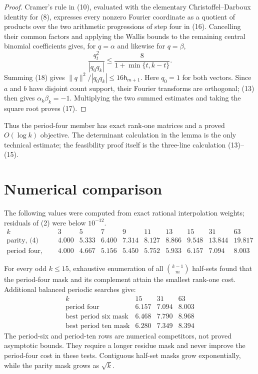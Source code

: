 \documentclass[11pt]{article}
\newcommand{\1}{\mathbf 1}
\newcommand{\norm}[1]{\lVert#1\rVert}
\begin{document}
\begin{proof}
Cramer's rule in (10), evaluated with the elementary
Christoffel--Darboux identity for (8), expresses every nonzero Fourier
coordinate as a quotient of products over the two arithmetic progressions
of step four in (16).  Cancelling their common factors and applying the
Wallis bounds to the remaining central binomial coefficients gives, for
$q=\alpha$ and likewise for $q=\beta$,
\[
 \frac{q_t^2}{|q_0q_k|}
 \le \frac{8}{1+\min\{t,k-t\}}.                         \tag{18}
\]
Summing (18) gives
$\norm q^2/|q_0q_k|\le16\mathsf h_{m+1}$.
Here $q_0=1$ for both vectors.  Since $a$ and $b$ have disjoint count
support, their Fourier transforms are orthogonal; (13) then gives
$\alpha_k\beta_k=-1$.  Multiplying the two summed estimates and taking
the square root proves (17).
\end{proof}

Thus the period-four member has exact rank-one matrices and a proved
$O(\log k)$ objective.  The determinant calculation in the lemma is the
only technical estimate; the feasibility proof itself is the three-line
calculation (13)--(15).

\section{Numerical comparison}

The following values were computed from exact rational interpolation
weights; residuals of (2) were below $10^{-12}$.
\[
\begin{array}{c|rrrrrrrrr}
 k&3&5&7&9&11&13&15&31&63\\ \hline
 \text{parity, (4)}
 &4.000&5.333&6.400&7.314&8.127&8.866&9.548&13.844&19.817\\
 \text{period four, (16)}
 &4.000&4.667&5.156&5.450&5.752&5.933&6.157&7.094&8.003
\end{array}                                               \tag{19}
\]

For every odd $k\le15$, exhaustive enumeration of all
$\binom{k-1}{m}$ half-sets found that the period-four mask and its
complement attain the smallest rank-one cost.  Additional balanced
periodic searches give:
\[
\begin{array}{c|rrr}
 k&15&31&63\\ \hline
 \text{period four}&6.157&7.094&8.003\\
 \text{best period six mask}&6.468&7.790&8.968\\
 \text{best period ten mask}&6.280&7.349&8.394
\end{array}                                               \tag{20}
\]
The period-six and period-ten rows are numerical competitors, not proved
asymptotic bounds.  They require a longer residue mask and never improve
the period-four cost in these tests.  Contiguous half-set masks grow
exponentially, while the parity mask grows as $\sqrt{k}$.
\end{document}
